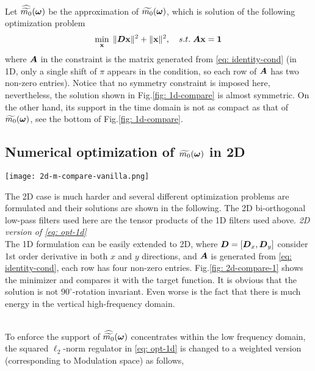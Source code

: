 Let $\widehat{\widetilde{m_{0}}}(\boldsymbol{\omega})$ be the approximation of $\widetilde{m_{0}}(\boldsymbol{\omega})$, which is solution of the following optimization problem
\begin{align}
\min_{\mathbf{x}}\; \Vert \boldsymbol{D}\mathbf{x}\Vert^2 + \Vert \mathbf{x}\Vert^2,\quad s.t. \; \boldsymbol{A}\mathbf{x} = \mathbf{1} \label{eq: opt-1d}
\end{align}
where $\boldsymbol{A}$ in the constraint is the matrix generated from \eqref{eq: identity-cond} (in 1D, only a single shift of $\pi$ appears in the condition, so each row of $\boldsymbol{A}$ has two non-zero entries). Notice that no symmetry constraint is imposed here, nevertheless, the solution shown in Fig.\ref{fig: 1d-compare} is almost symmetric. On the other hand, its support in the time domain is not as compact as that of $\widetilde{m_{0}}(\boldsymbol{\omega})$, see the bottom of Fig.\ref{fig: 1d-compare}.

\subsection{Numerical optimization of $\widetilde{m_{0}}(\boldsymbol{\omega})$ in 2D}
\begin{minipage}[c]{.45\textwidth}
\centering
\texttt{[image: 2d-m-compare-vanilla.png]}
\label{fig: 2d-compare-1}
\end{minipage}
\hfill
\begin{minipage}[c]{.5\textwidth}
The 2D case is much harder and several different optimization problems are formulated and their solutions are shown in the following. The 2D bi-orthogonal low-pass filters used here are the tensor products of the 1D filters used above.
{\it 2D version of \eqref{eq: opt-1d}}\\
 The 1D formulation can be easily extended to 2D, where $\boldsymbol{D} = [\boldsymbol{D}_x,\boldsymbol{D}_y]$ consider 1st order derivative in both $x$ and $y$ directions, and $\boldsymbol{A}$ is generated from \eqref{eq: identity-cond}, each row has four non-zero entries. Fig.\ref{fig: 2d-compare-1} shows the minimizer and compares it with the target function. It is obvious that the solution is not $90^\circ$-rotation invariant. Even worse is the fact that there is much energy in the vertical high-frequency domain.
\end{minipage}
\\[1em]
To enforce the support of $\widehat{\widetilde{m_{0}}}(\boldsymbol{\omega})$ concentrates within the low frequency domain, the squared $\ell_2$-norm regulator in \eqref{eq: opt-1d} is changed to a weighted version (corresponding to Modulation space) as follows,
